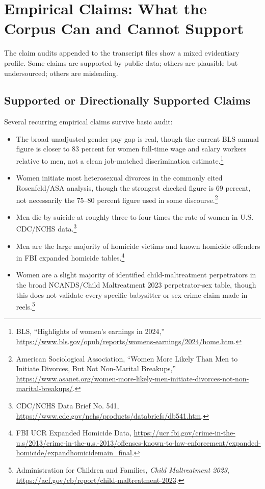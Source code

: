\documentclass[12pt]{article}
\newcommand{\SourceNote}[1]{\footnote{#1}}
\begin{document}
\section{Empirical Claims: What the Corpus Can and Cannot Support}

The claim audits appended to the transcript files show a mixed evidentiary profile. Some claims are supported by public data; others are plausible but undersourced; others are misleading.

\subsection{Supported or Directionally Supported Claims}

Several recurring empirical claims survive basic audit:

\begin{itemize}
  \item The broad unadjusted gender pay gap is real, though the current BLS annual figure is closer to 83 percent for women full-time wage and salary workers relative to men, not a clean job-matched discrimination estimate.\SourceNote{BLS, ``Highlights of women's earnings in 2024,'' \url{https://www.bls.gov/opub/reports/womens-earnings/2024/home.htm}.}
  \item Women initiate most heterosexual divorces in the commonly cited Rosenfeld/ASA analysis, though the strongest checked figure is 69 percent, not necessarily the 75--80 percent figure used in some discourse.\SourceNote{American Sociological Association, ``Women More Likely Than Men to Initiate Divorces, But Not Non-Marital Breakups,'' \url{https://www.asanet.org/women-more-likely-men-initiate-divorces-not-non-marital-breakups/}.}
  \item Men die by suicide at roughly three to four times the rate of women in U.S. CDC/NCHS data.\SourceNote{CDC/NCHS Data Brief No. 541, \url{https://www.cdc.gov/nchs/products/databriefs/db541.htm}.}
  \item Men are the large majority of homicide victims and known homicide offenders in FBI expanded homicide tables.\SourceNote{FBI UCR Expanded Homicide Data, \url{https://ucr.fbi.gov/crime-in-the-u.s/2013/crime-in-the-u.s.-2013/offenses-known-to-law-enforcement/expanded-homicide/expandhomicidemain_final}.}
  \item Women are a slight majority of identified child-maltreatment perpetrators in the broad NCANDS/Child Maltreatment 2023 perpetrator-sex table, though this does not validate every specific babysitter or sex-crime claim made in reels.\SourceNote{Administration for Children and Families, \textit{Child Maltreatment 2023}, \url{https://acf.gov/cb/report/child-maltreatment-2023}.}

\end{itemize}
\end{document}
